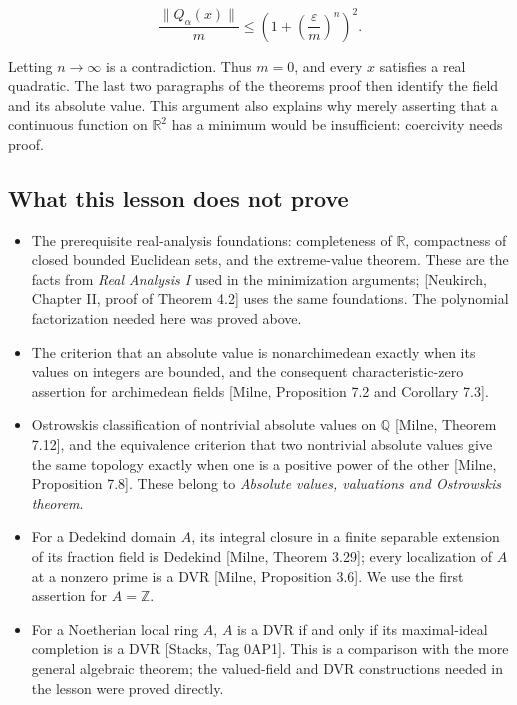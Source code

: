 \documentclass[
  english,
  11pt,
  a4paper,
]{article}
\providecommand{\tightlist}{%
  \setlength{\itemsep}{0pt}\setlength{\parskip}{0pt}}
\begin{document}
\[\frac{\|Q_\alpha(x)\|}{m}
\le\left(1+\left(\frac\varepsilon m\right)^n\right)^2.\]

Letting \(n\to\infty\) is a contradiction. Thus \(m=0\), and every \(x\)
satisfies a real quadratic. The last two paragraphs of the
theorem\textquotesingle s proof then identify the field and its absolute
value. This argument also explains why merely asserting that a
continuous function on \(\mathbb R^2\) has a minimum would be
insufficient: coercivity needs proof.

\subsection{What this lesson does not
prove}\label{NT-LOC-02--what-this-lesson-does-not-prove}

\begin{itemize}
\tightlist
\item
  The prerequisite real-analysis foundations: completeness of
  \(\mathbb R\), compactness of closed bounded Euclidean sets, and the
  extreme-value theorem. These are the facts from \emph{Real Analysis I}
  used in the minimization arguments; {[}Neukirch, Chapter II, proof of
  Theorem 4.2{]} uses the same foundations. The polynomial factorization
  needed here was proved above.
\item
  The criterion that an absolute value is nonarchimedean exactly when
  its values on integers are bounded, and the consequent
  characteristic-zero assertion for archimedean fields {[}Milne,
  Proposition 7.2 and Corollary 7.3{]}.
\item
  Ostrowski\textquotesingle s classification of nontrivial absolute
  values on \(\mathbb Q\) {[}Milne, Theorem 7.12{]}, and the equivalence
  criterion that two nontrivial absolute values give the same topology
  exactly when one is a positive power of the other {[}Milne,
  Proposition 7.8{]}. These belong to \emph{Absolute values, valuations
  and Ostrowski\textquotesingle s theorem}.
\item
  For a Dedekind domain \(A\), its integral closure in a finite
  separable extension of its fraction field is Dedekind {[}Milne,
  Theorem 3.29{]}; every localization of \(A\) at a nonzero prime is a
  DVR {[}Milne, Proposition 3.6{]}. We use the first assertion for
  \(A=\mathbb Z\).
\item
  For a Noetherian local ring \(A\), \(A\) is a DVR if and only if its
  maximal-ideal completion is a DVR {[}Stacks, Tag 0AP1{]}. This is a
  comparison with the more general algebraic theorem; the valued-field
  and DVR constructions needed in the lesson were proved directly.
\end{itemize}
\end{document}
